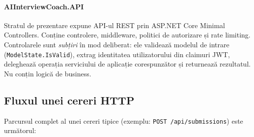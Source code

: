 \paragraph{AIInterviewCoach.API}
Stratul de prezentare expune API-ul REST prin ASP.NET Core Minimal
Controllers.
Conține controlere, middleware, politici de autorizare și rate limiting.
Controlarele sunt \emph{subțiri} în mod deliberat: ele validează
modelul de intrare (\texttt{ModelState.IsValid}), extrag identitatea
utilizatorului din claimuri JWT, deleghează operația serviciului de
aplicație corespunzător și returnează rezultatul.
Nu conțin logică de business.

\subsection{Fluxul unei cereri HTTP}

Parcursul complet al unei cereri tipice (exemplu: \texttt{POST /api/submissions})
este următorul:

